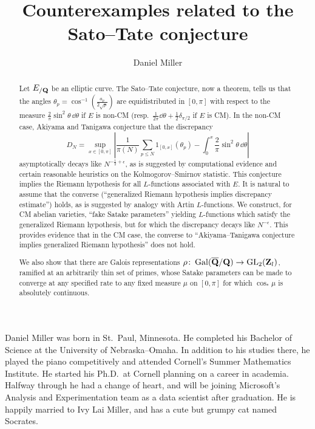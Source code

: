 \documentclass[phd,cornellheadings,tocprelim]{cornell}
\title{Counterexamples related to the Sato--Tate conjecture}
\author{Daniel Miller}
\begin{document}
\maketitle
\makecopyright

\begin{abstract}
Let $E_{/\mathbf{Q}}$ be an elliptic curve. The Sato--Tate conjecture, now a theorem, 
tells us that the angles $\theta_p =\cos^{-1}\left(\frac{a_p}{2\sqrt p}\right)$ 
are equidistributed in $[0,\pi]$ with respect to the measure 
$\frac{2}{\pi}\sin^2\theta\, \dd\theta$ if $E$ is non-CM
(resp.~$\frac{1}{2\pi} \dd \theta + \frac 1 2 \delta_{\pi/2}$ if $E$ is CM). 
In the non-CM case, Akiyama and Tanigawa conjecture that the discrepancy 
\[
	D_N = \sup_{x\in [0,\pi]} \left| \frac{1}{\pi(N)} \sum_{p\leqslant N} 1_{[0,x]}(\theta_p) - \int_0^x \frac{2}{\pi}\sin^2\theta\, \dd\theta\right| 
\]
asymptotically decays like $N^{-\frac 1 2+\epsilon}$, as is suggested by computational 
evidence and certain reasonable heuristics on the Kolmogorov--Smirnov 
statistic. This conjecture implies the Riemann hypothesis 
for all $L$-functions associated with $E$. It is natural to assume that the 
converse (``generalized Riemann hypothesis implies discrepancy estimate'') holds, 
as is suggested by analogy with Artin $L$-functions. We construct, for CM abelian 
varieties, ``fake Satake parameters'' yielding $L$-functions which satisfy 
the generalized Riemann hypothesis, but for which the discrepancy decays like 
$N^{-\epsilon}$. This provides evidence that in the CM case, the converse to 
``Akiyama--Tanigawa conjecture implies generalized Riemann hypothesis'' does 
not hold. 

We also show that there are Galois representations 
$\rho\colon \operatorname{Gal}(\overline {\mathbf{Q}} /\mathbf{Q}) \to \operatorname{GL}_2(\mathbf{Z}_l)$, ramified at an 
arbitrarily thin set of primes, whose Satake parameters can be made to 
converge at any specified rate to any fixed measure $\mu$ on $[0,\pi]$ for 
which $\cos_\ast\mu$ is absolutely continuous. 
\end{abstract}

\begin{biosketch}
Daniel Miller was born in St.~Paul, Minnesota. He completed his Bachelor of 
Science at the University of Nebraska--Omaha. In addition to his studies there, 
he played the piano competitively and attended Cornell's Summer Mathematics 
Institute. He started his Ph.D.~at Cornell planning on a career in academia. 
Halfway through he had a change of heart, and will be joining Microsoft's 
Analysis and Experimentation team as a data scientist after graduation. He is 
happily married to Ivy Lai Miller, and has a cute but grumpy cat named Socrates. 
\end{biosketch}
\end{document}
